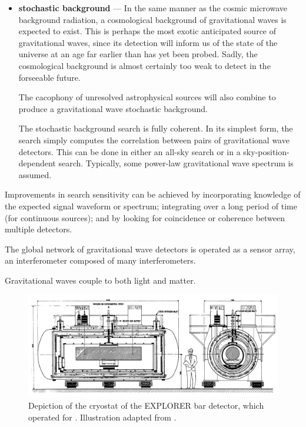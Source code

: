 \begin{itemize}
\item \textbf{stochastic background} --- In the same manner as the
  cosmic microwave background radiation, a cosmological background of
  gravitational waves is expected to exist.  This is perhaps the most
  exotic anticipated source of gravitational waves, since its
  detection will inform us of the state of the universe at an age far
  earlier than has yet been probed.  Sadly, the cosmological
  background is almost certainly too weak to detect in the forseeable
  future.

  The cacophony of unresolved astrophysical sources will also combine
  to produce a gravitational wave stochastic background.   

  The stochastic background search is fully coherent.  In its simplest
  form, the search simply computes the correlation between pairs of
  gravitational wave detectors.  This can be done in either an all-sky
  search or in a sky-position-dependent search.  Typically, some
  power-law gravitational wave spectrum is assumed.

\end{itemize}

Improvements in search sensitivity can be achieved by incorporating
knowledge of the expected signal waveform or spectrum; integrating
over a long period of time (for continuous sources); and by looking
for coincidence or coherence between multiple detectors.

The global network of gravitational wave detectors is operated as a
sensor array, an interferometer composed of many interferometers.

Gravitational waves couple to both light and matter.

\begin{figure}
\includegraphics[width=\columnwidth]{chapter1/figures/explorer.png}
\caption{\label{fig:explorer-bar}Depiction of the cryostat of the
  EXPLORER bar detector, which operated  for
  .  Illustration adapted from .}
\end{figure}


